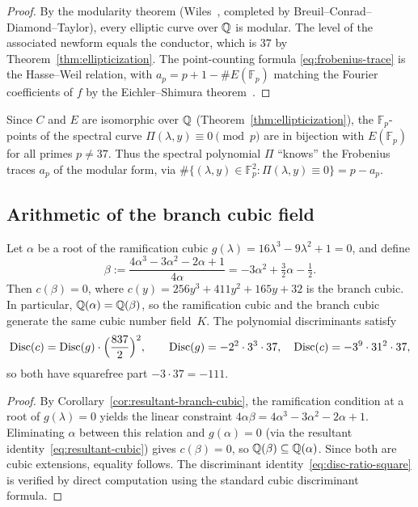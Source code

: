 \begin{proof}
By the modularity theorem (Wiles~\cite{WilesTaylor1995}, completed by Breuil--Conrad--Diamond--Taylor), every elliptic curve over $\mathbb{Q}$ is modular.
The level of the associated newform equals the conductor, which is $37$ by Theorem~\ref{thm:ellipticization}.
The point-counting formula \eqref{eq:frobenius-trace} is the Hasse--Weil relation, with $a_p=p+1-\#E(\mathbb{F}_p)$ matching the Fourier coefficients of $f$ by the Eichler--Shimura theorem~\cite{Silverman2009}.
\end{proof}

\begin{remark}\label{rmk:finite-field}
Since $C$ and $E$ are isomorphic over $\mathbb{Q}$ (Theorem~\ref{thm:ellipticization}), the $\mathbb{F}_p$-points of the spectral curve $\Pi(\lambda,y)\equiv 0\pmod{p}$ are in bijection with $E(\mathbb{F}_p)$ for all primes $p\neq 37$.
Thus the spectral polynomial $\Pi$ ``knows'' the Frobenius traces $a_p$ of the modular form, via
$\#\{(\lambda,y)\in\mathbb{F}_p^2:\Pi(\lambda,y)\equiv 0\}=p-a_p$.
\end{remark}

\subsection{Arithmetic of the branch cubic field}

\begin{proposition}\label{prop:cubic-isomorphism}
Let $\alpha$ be a root of the ramification cubic $g(\lambda)=16\lambda^3-9\lambda^2+1=0$, and define
\[
\beta:=\frac{4\alpha^3-3\alpha^2-2\alpha+1}{4\alpha}=-3\alpha^2+\tfrac{3}{2}\alpha-\tfrac{1}{2}.
\]
Then $c(\beta)=0$, where $c(y)=256y^3+411y^2+165y+32$ is the branch cubic.
In particular, $\mathbb{Q}(\alpha)=\mathbb{Q}(\beta)$, so the ramification cubic and the branch cubic generate the same cubic number field~$K$.
The polynomial discriminants satisfy
\begin{equation}\label{eq:disc-ratio-square}
\operatorname{Disc}(c)=\operatorname{Disc}(g)\cdot\Bigl(\frac{837}{2}\Bigr)^2,\qquad \operatorname{Disc}(g)=-2^2\cdot 3^3\cdot 37,\quad \operatorname{Disc}(c)=-3^9\cdot 31^2\cdot 37,
\end{equation}
so both have squarefree part $-3\cdot 37=-111$.
\end{proposition}

\begin{proof}
By Corollary~\ref{cor:resultant-branch-cubic}, the ramification condition at a root of $g(\lambda)=0$ yields the linear constraint $4\alpha\beta=4\alpha^3-3\alpha^2-2\alpha+1$.
Eliminating $\alpha$ between this relation and $g(\alpha)=0$ (via the resultant identity~\eqref{eq:resultant-cubic}) gives $c(\beta)=0$, so $\mathbb{Q}(\beta)\subseteq\mathbb{Q}(\alpha)$.
Since both are cubic extensions, equality follows.
The discriminant identity~\eqref{eq:disc-ratio-square} is verified by direct computation using the standard cubic discriminant formula.
\end{proof}

